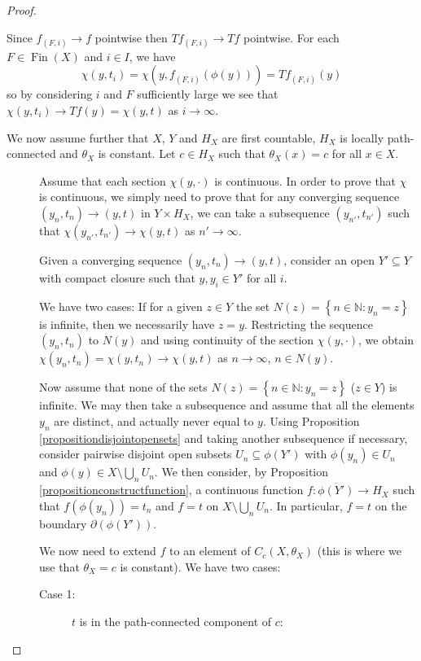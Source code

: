 \begin{proof}
\begin{description}
	Since $f_{(F,i)}\to f$ pointwise then $Tf_{(F,i)}\to Tf$ pointwise. For each $F\in\operatorname{Fin}(X)$ and $i\in I$, we have
\[\chi(y,t_i)=\chi(y,f_{(F,i)}(\phi(y)))=Tf_{(F,i)}(y)\]
so by considering $i$ and $F$ sufficiently large we see that $\chi(y,t_i)\to Tf(y)=\chi(y,t)$ as $i\to\infty$.
\end{description}

We now assume further that $X$, $Y$ and $H_X$ are first countable, $H_X$ is locally path-connected and $\theta_X$ is constant. Let $c\in H_X$ such that $\theta_X(x)=c$ for all $x\in X$.
\begin{description}
\item[] Assume that each section $\chi(y,\cdot)$ is continuous. In order to prove that $\chi$ is continuous, we simply need to prove that for any converging sequence $(y_n,t_n)\to (y,t)$ in $Y\times H_X$, we can take a subsequence $(y_{n'},t_{n'})$ such that $\chi(y_{n'},t_{n'})\to \chi(y,t)$ as $n'\to\infty$.

Given a converging sequence $(y_n,t_n)\to(y,t)$, consider an open $Y'\subseteq Y$ with compact closure such that $y,y_i\in Y'$ for all $i$.

We have two cases: If for a given $z\in Y$ the set $N(z)=\left\{n\in\mathbb{N}:y_n=z\right\}$ is infinite, then we necessarily have $z=y$. Restricting the sequence $(y_n,t_n)$ to $N(y)$ and using continuity of the section $\chi(y,\cdot)$, we obtain $\chi(y_n,t_n)=\chi(y,t_n)\to \chi(y,t)$ as $n\to\infty$, $n\in N(y)$.

Now assume that none of the sets $N(z)=\left\{n\in\mathbb{N}: y_n=z\right\}$ ($z\in Y$) is infinite. We may then take a subsequence and assume that all the elements $y_n$ are distinct, and actually never equal to $y$. Using Proposition \ref{propositiondisjointopensets} and taking another subsequence if necessary, consider pairwise disjoint open subsets $U_n\subseteq\phi(Y')$ with $\phi(y_n)\in U_n$ and $\phi(y)\in X\setminus\bigcup_n U_n$. We then consider, by Proposition \ref{propositionconstructfunction}, a continuous function $f:\overline{\phi(Y')}\to H_X$ such that $f(\phi(y_n))=t_n$ and $f=t$ on $X\setminus \bigcup_n U_n$. In particular, $f=t$ on the boundary $\partial(\phi(Y'))$.

We now need to extend $f$ to an element of $C_c(X,\theta_X)$ (this is where we use that $\theta_X=c$ is constant). We have two cases:%
\begin{description}
\item[Case 1:] $t$ is in the path-connected component of $c$:


\end{description}
\end{description}
\end{proof}
